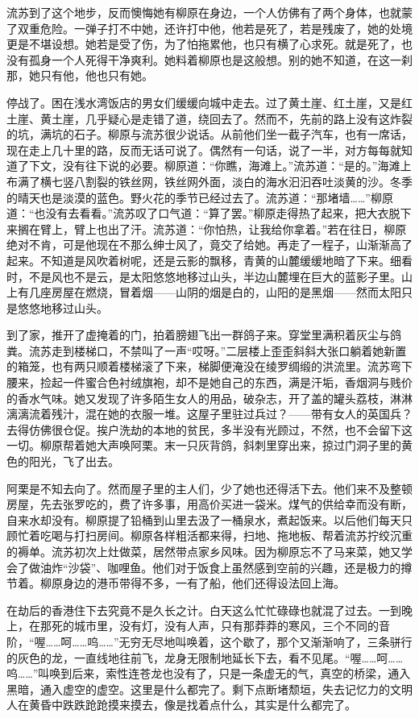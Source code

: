 \par 流苏到了这个地步，反而懊悔她有柳原在身边，一个人仿佛有了两个身体，也就蒙了双重危险。一弹子打不中她，还许打中他，他若是死了，若是残废了，她的处境更是不堪设想。她若是受了伤，为了怕拖累他，也只有横了心求死。就是死了，也没有孤身一个人死得干净爽利。她料着柳原也是这般想。别的她不知道，在这一刹那，她只有他，他也只有她。
\par 停战了。困在浅水湾饭店的男女们缓缓向城中走去。过了黄土崖、红土崖，又是红土崖、黄土崖，几乎疑心是走错了道，绕回去了。然而不，先前的路上没有这炸裂的坑，满坑的石子。柳原与流苏很少说话。从前他们坐一截子汽车，也有一席话，现在走上几十里的路，反而无话可说了。偶然有一句话，说了一半，对方每每就知道了下文，没有往下说的必要。柳原道：“你瞧，海滩上。”流苏道：“是的。”海滩上布满了横七竖八割裂的铁丝网，铁丝网外面，淡白的海水汩汩吞吐淡黄的沙。冬季的晴天也是淡漠的蓝色。野火花的季节已经过去了。流苏道：“那堵墙……”柳原道：“也没有去看看。”流苏叹了口气道：“算了罢。”柳原走得热了起来，把大衣脱下来搁在臂上，臂上也出了汗。流苏道：“你怕热，让我给你拿着。”若在往日，柳原绝对不肯，可是他现在不那么绅士风了，竟交了给她。再走了一程子，山渐渐高了起来。不知道是风吹着树呢，还是云影的飘移，青黄的山麓缓缓地暗了下来。细看时，不是风也不是云，是太阳悠悠地移过山头，半边山麓埋在巨大的蓝影子里。山上有几座房屋在燃烧，冒着烟——山阴的烟是白的，山阳的是黑烟——然而太阳只是悠悠地移过山头。
\par 到了家，推开了虚掩着的门，拍着膀翅飞出一群鸽子来。穿堂里满积着灰尘与鸽粪。流苏走到楼梯口，不禁叫了一声“哎呀。”二层楼上歪歪斜斜大张口躺着她新置的箱笼，也有两只顺着楼梯滚了下来，梯脚便淹没在绫罗绸缎的洪流里。流苏弯下腰来，捡起一件蜜合色衬绒旗袍，却不是她自己的东西，满是汗垢，香烟洞与贱价的香水气味。她又发现了许多陌生女人的用品，破杂志，开了盖的罐头荔枝，淋淋漓漓流着残汁，混在她的衣服一堆。这屋子里驻过兵过？——带有女人的英国兵？去得仿佛很仓促。挨户洗劫的本地的贫民，多半没有光顾过，不然，也不会留下这一切。柳原帮着她大声唤阿栗。末一只灰背鸽，斜刺里穿出来，掠过门洞子里的黄色的阳光，飞了出去。
\par 阿栗是不知去向了。然而屋子里的主人们，少了她也还得活下去。他们来不及整顿房屋，先去张罗吃的，费了许多事，用高价买进一袋米。煤气的供给幸而没有断，自来水却没有。柳原提了铅桶到山里去汲了一桶泉水，煮起饭来。以后他们每天只顾忙着吃喝与打扫房间。柳原各样粗活都来得，扫地、拖地板、帮着流苏拧绞沉重的褥单。流苏初次上灶做菜，居然带点家乡风味。因为柳原忘不了马来菜，她又学会了做油炸“沙袋”、咖哩鱼。他们对于饭食上虽然感到空前的兴趣，还是极力的撙节着。柳原身边的港币带得不多，一有了船，他们还得设法回上海。
\par 在劫后的香港住下去究竟不是久长之计。白天这么忙忙碌碌也就混了过去。一到晚上，在那死的城市里，没有灯，没有人声，只有那莽莽的寒风，三个不同的音阶，“喔……呵……呜……”无穷无尽地叫唤着，这个歇了，那个又渐渐响了，三条骈行的灰色的龙，一直线地往前飞，龙身无限制地延长下去，看不见尾。“喔……呵……呜……”叫唤到后来，索性连苍龙也没有了，只是一条虚无的气，真空的桥梁，通入黑暗，通入虚空的虚空。这里是什么都完了。剩下点断堵颓垣，失去记忆力的文明人在黄昏中跌跌跄跄摸来摸去，像是找着点什么，其实是什么都完了。
